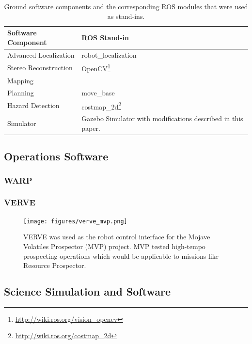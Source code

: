 \documentclass[twocolumn,letterpaper]{IEEEAerospaceCLS}  %
\begin{document}
\begin{table}[htp]
\caption{Ground software components and the corresponding ROS modules that were used as stand-ins.\label{tbl:ground-software-components}}
\begin{tabular}{l|p{4cm}}
\textbf{Software Component} & \textbf{ROS Stand-in} \\
\hline 
Advanced Localization & robot\_localization\\
Stereo Reconstruction & OpenCV\footnote{\url{http://wiki.ros.org/vision_opencv}}\\
Mapping & \\
Planning & move\_base\\
Hazard Detection & costmap\_2d\footnote{\url{http://wiki.ros.org/costmap_2d}}\\
Simulator & Gazebo Simulator with modifications described in this paper.\\
\hline
\end{tabular}
\end{table}



\subsection{Operations Software}

\subsubsection{WARP}

\cite{trimble2016open} 

\subsubsection{VERVE}

\cite{lee2013reusable} 

\begin{figure}[htp]
\centering
\texttt{[image: figures/verve\_mvp.png]}
\caption{VERVE was used as the robot control interface for the Mojave Volatiles Prospector (MVP) project.  MVP tested high-tempo prospecting operations which would be applicable to missions like Resource Prospector.\label{fig:verve-mvp}}
\end{figure}

\subsection{Science Simulation and Software}
\end{document}
